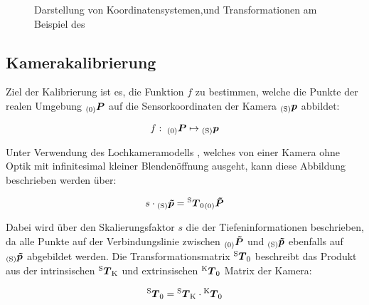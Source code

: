 \begin{figure}[ht]
	\begin{center}%
		\caption{Darstellung von Koordinatensystemen,\red[ Punkten] und Transformationen am Beispiel des }
		\label{fig.coords}
	\end{center}
\end{figure}

\subsection{Kamerakalibrierung}
Ziel der Kalibrierung ist es, die Funktion $f$ zu bestimmen, welche die Punkte der realen Umgebung ${_{{\mathrm{(0)}}}}\mbox{\boldmath{$P$}}$ auf die Sensorkoordinaten der Kamera ${_{{\mathrm{(S)}}}}\mbox{\boldmath{$p$}}$ abbildet:

\begin{equation}
f : \; {_{{\mathrm{(0)}}}}\mbox{\boldmath{$P$}} \mapsto {_{{\mathrm{(S)}}}}\mbox{\boldmath{$p$}}
\end{equation}

Unter Verwendung des Lochkameramodells , welches von einer Kamera ohne Optik mit infinitesimal kleiner Blendenöffnung ausgeht, kann diese Abbildung beschrieben werden über:

\begin{equation}
s \cdot {_{{\mathrm{(S)}}}}\mbox{\boldmath{$\tilde{p}$}} = {^{\mathrm{S}}\mbox{\boldmath{$T$}}_{\mathrm{0}}}{_{{\mathrm{(0)}}}}\mbox{\boldmath{$\tilde{P}$}}
\label{eq.persp_abb}
\end{equation}

Dabei wird über den Skalierungsfaktor $s$ die \red[Uneindeutigkeit] der Tiefeninformationen beschrieben, da alle Punkte auf der Verbindungslinie zwischen ${_{{\mathrm{(0)}}}}\mbox{\boldmath{$\tilde{P}$}}$ und ${_{{\mathrm{(S)}}}}\mbox{\boldmath{$\tilde{p}$}}$ ebenfalls auf ${_{{\mathrm{(S)}}}}\mbox{\boldmath{$\tilde{p}$}}$ abgebildet werden. 
Die Transformationsmatrix ${^{\mathrm{S}}\mbox{\boldmath{$T$}}_{\mathrm{0}}}$ beschreibt das Produkt aus der intrinsischen ${^{\mathrm{S}}\mbox{\boldmath{$T$}}_{\mathrm{K}}}$ und extrinsischen ${^{\mathrm{K}}\mbox{\boldmath{$T$}}_{\mathrm{0}}}$ Matrix der Kamera:

\begin{equation}
{^{\mathrm{S}}\mbox{\boldmath{$T$}}_{\mathrm{0}}} = {^{\mathrm{S}}\mbox{\boldmath{$T$}}_{\mathrm{K}}} \cdot {^{\mathrm{K}}\mbox{\boldmath{$T$}}_{\mathrm{0}}}
\end{equation}

